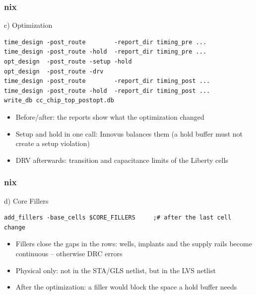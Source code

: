 \documentclass{beamer}
\newcommand{\astitle}{nix}
\newcommand{\assubtitle}{nix}
\begin{document}
\renewcommand{\assubtitle}{c) Optimization}
\begin{frame}[fragile]
\frametitle{\astitle}
\begin{block}{\assubtitle}
\begin{lstlisting}[style=sh]
time_design -post_route        -report_dir timing_pre ...
time_design -post_route -hold  -report_dir timing_pre ...
opt_design  -post_route -setup -hold
opt_design  -post_route -drv
time_design -post_route        -report_dir timing_post ...
time_design -post_route -hold  -report_dir timing_post ...
write_db cc_chip_top_postopt.db
\end{lstlisting}
  \begin{itemize}
    \item Before/after: the reports show what the optimization changed
    \item Setup and hold in one call: Innovus balances them (a hold
      buffer must not create a setup violation)
    \item DRV afterwards: transition and capacitance limits of the
      Liberty cells
  \end{itemize}
\end{block}
\end{frame}

\renewcommand{\assubtitle}{d) Core Fillers}
\begin{frame}[fragile]
\frametitle{\astitle}
\begin{block}{\assubtitle}
\begin{lstlisting}[style=sh]
add_fillers -base_cells $CORE_FILLERS     ;# after the last cell change
\end{lstlisting}
  \begin{itemize}
    \item Fillers close the gaps in the rows: wells, implants and the
      supply rails become continuous -- otherwise DRC errors
    \item Physical only: not in the STA/GLS netlist, but in the LVS
      netlist
    \item After the optimization: a filler would block the space a hold
      buffer needs
  \end{itemize}
\end{block}
\end{frame}
\end{document}
